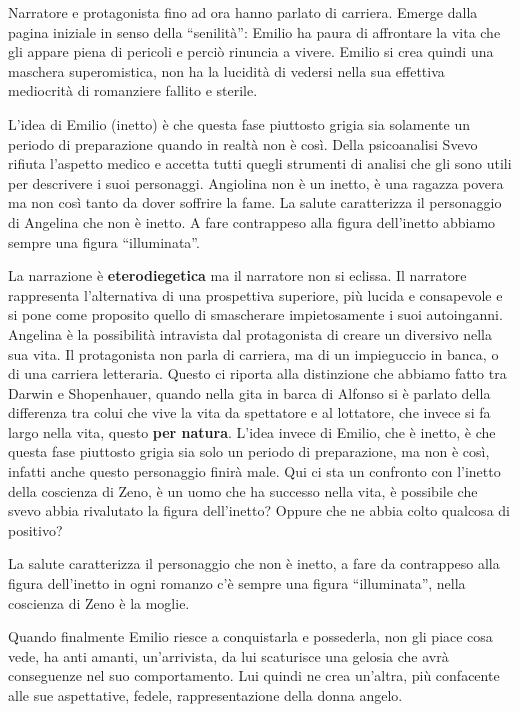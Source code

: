 \documentclass[a4paper, twoside, titlepage]{book}
\begin{document}
Narratore e protagonista fino ad ora hanno parlato di carriera.
Emerge dalla pagina iniziale in senso della “senilità”: Emilio ha paura di affrontare la vita che gli appare piena di pericoli e perciò rinuncia a vivere. Emilio si crea quindi una maschera superomistica, non ha la lucidità di vedersi nella sua effettiva mediocrità di romanziere fallito e sterile.

L’idea di Emilio (inetto) è che questa fase piuttosto grigia sia solamente un periodo di preparazione quando in realtà non è così.
Della psicoanalisi Svevo rifiuta l’aspetto medico e accetta tutti quegli strumenti di analisi che gli sono utili per descrivere i suoi personaggi. Angiolina non è un inetto, è una ragazza povera ma non così tanto da dover soffrire la fame. La salute caratterizza il personaggio di Angelina che non è inetto. A fare contrappeso alla figura dell’inetto abbiamo sempre una figura “illuminata”.

La narrazione è \textbf{eterodiegetica} ma il narratore non si eclissa. Il narratore rappresenta l’alternativa di una prospettiva superiore, più lucida e consapevole e si pone come proposito quello di smascherare impietosamente i suoi autoinganni.
Angelina è la possibilità intravista dal protagonista di creare un diversivo nella sua vita. Il protagonista non parla di carriera, ma di un impieguccio in banca, o di una carriera letteraria.
Questo ci riporta alla distinzione che abbiamo fatto tra Darwin e Shopenhauer, quando nella gita in barca di Alfonso si è parlato della differenza tra colui che vive la vita da spettatore e al lottatore, che invece si fa largo nella vita, questo \textbf{per natura}.
L’idea invece di Emilio, che è inetto, è che questa fase piuttosto grigia sia solo un periodo di preparazione, ma non è così, infatti anche questo personaggio finirà male.
Qui ci sta un  confronto con l’inetto della coscienza di Zeno, è un uomo che ha successo nella vita, è possibile che svevo abbia rivalutato la figura dell’inetto?  Oppure che ne abbia colto qualcosa di positivo?

La salute caratterizza il personaggio che non è inetto, a fare da contrappeso alla figura dell’inetto in ogni romanzo c’è sempre una figura “illuminata”, nella coscienza di Zeno è la moglie.

Quando finalmente Emilio riesce a conquistarla e possederla, non gli piace cosa vede, ha anti amanti, un’arrivista, da lui scaturisce una gelosia che avrà conseguenze nel suo comportamento. Lui quindi ne crea un’altra, più confacente alle sue aspettative, fedele, rappresentazione della donna angelo.
\end{document}
